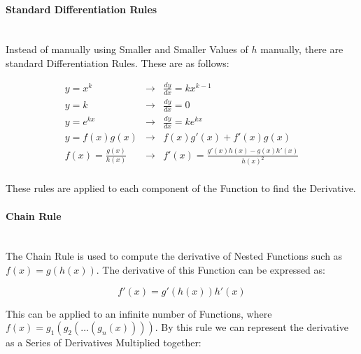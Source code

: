 \begin{flushleft}
                \paragraph{Standard Differentiation Rules}  \mbox{} \\
                    \vspace{0.2cm}
                    Instead of manually using Smaller and Smaller Values of $h$ manually, there are standard Differentiation Rules. These are as follows: \\
                    \vspace{0.4cm}

                    \begin{eqnarray*}
                        y = x^{k} &\rightarrow& \frac{dy}{dx} = kx^{k-1} \\
                        y = k &\rightarrow& \frac{dy}{dx} = 0 \\
                        y = e^{kx} &\rightarrow& \frac{dy}{dx} = ke^{kx} \\
                        y = f(x)g(x) &\rightarrow& f(x)g'(x) + f'(x)g(x) \\
                        f(x) = \frac{g(x)}{h(x)} &\rightarrow& f'(x) = \frac{g'(x)h(x) - g(x)h'(x)}{h(x)^{2}} \\
                    \end{eqnarray*}
                    \vspace{0.4cm}

                    These rules are applied to each component of the Function to find the Derivative. 

                \paragraph{Chain Rule}  \mbox{} \\
                    \vspace{0.2cm}
                    The Chain Rule is used to compute the derivative of Nested Functions such as $f(x) = g(h(x))$. The derivative of this Function can be expressed as: \\
                    \vspace{0.4cm}

                    \[f'(x) =  g'(h(x))h'(x)\]

                    \vspace{0.4cm}

                    This can be applied to an infinite number of Functions, where $f(x) = g_{1}(g_{2}(\hdots(g_{n}(x))))$. By this rule we can represent the derivative as
                    a Series of Derivatives Multiplied together:


\end{flushleft}
